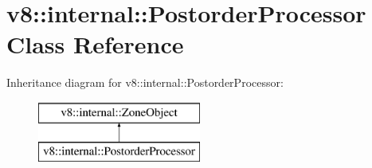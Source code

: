 \hypertarget{classv8_1_1internal_1_1_postorder_processor}{}\section{v8\+:\+:internal\+:\+:Postorder\+Processor Class Reference}
\label{classv8_1_1internal_1_1_postorder_processor}
Inheritance diagram for v8\+:\+:internal\+:\+:Postorder\+Processor\+:\begin{figure}[H]
\begin{center}
\leavevmode
\includegraphics[height=2.000000cm]{classv8_1_1internal_1_1_postorder_processor}
\end{center}
\end{figure}
